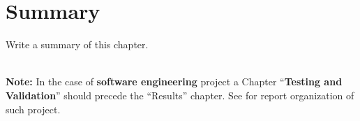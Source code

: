  
 

\section{Summary}
Write a summary of this chapter.

~\\[5em]
\noindent
{\huge\textbf{Note:}} In the case of \textbf{software engineering} project a Chapter ``\textbf{Testing and Validation}'' should precede the ``Results'' chapter. See for report organization of such project. 

